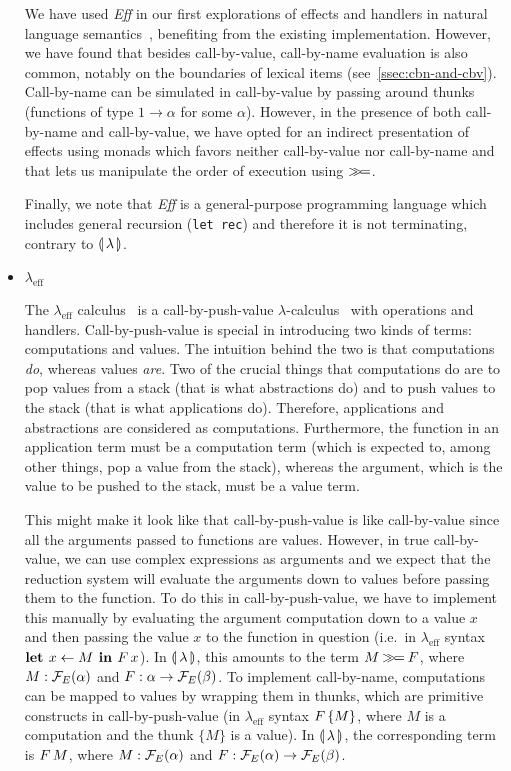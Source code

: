 \begin{itemize}
  We have used \emph{Eff} in our first explorations of effects and handlers
  in natural language semantics~\cite{marsik2014algebraic}, benefiting from
  the existing implementation. However, we have found that besides
  call-by-value, call-by-name evaluation is also common, notably on the
  boundaries of lexical items (see~\ref{ssec:cbn-and-cbv}). Call-by-name
  can be simulated in call-by-value by passing around thunks (functions of
  type $1 \to \alpha$ for some $\alpha$). However, in the presence of both
  call-by-name and call-by-value, we have opted for an indirect
  presentation of effects using monads which favors neither call-by-value
  nor call-by-name and that lets us manipulate the order of execution using
  $\mathbin{\gg\!=}$.

  Finally, we note that \emph{Eff} is a general-purpose programming
  language which includes general recursion (\texttt{let rec}) and
  therefore it is not terminating, contrary to ${\llparenthesis \, \lambda \, \rrparenthesis}$.
  
\item $\lambda_{\mathrm{eff}}$

  The $\lambda_{\mathrm{eff}}$ calculus~\cite{kammar2013handlers} is a
  call-by-push-value $\lambda$-calculus~\cite{levy1999call} with operations
  and handlers. Call-by-push-value is special in introducing two kinds of
  terms: computations and values. The intuition behind the two is that
  computations \emph{do}, whereas values \emph{are}. Two of the crucial
  things that computations do are to pop values from a stack (that is what
  abstractions do) and to push values to the stack (that is what
  applications do). Therefore, applications and abstractions are considered
  as computations. Furthermore, the function in an application term must be
  a computation term (which is expected to, among other things, pop a value
  from the stack), whereas the argument, which is the value to be pushed to
  the stack, must be a value term.

  This might make it look like that call-by-push-value is like
  call-by-value since all the arguments passed to functions are
  values. However, in true call-by-value, we can use complex expressions as
  arguments and we expect that the reduction system will evaluate the
  arguments down to values before passing them to the function. To do this
  in call-by-push-value, we have to implement this manually by evaluating
  the argument computation down to a value $x$ and then passing the value
  $x$ to the function in question (i.e.\ in $\lambda_{\mathrm{eff}}$ syntax
  $\textbf{let } x \leftarrow M \textbf{ in } F\,x$). In ${\llparenthesis \, \lambda \, \rrparenthesis}$, this
  amounts to the term $M \mathbin{\gg\!=} F$, where $M : \mathcal{F}_E(\alpha)$ and
  $F : \alpha \to \mathcal{F}_E(\beta)$. To implement call-by-name, computations
  can be mapped to values by wrapping them in thunks, which are primitive
  constructs in call-by-push-value (in $\lambda_{\mathrm{eff}}$ syntax
  $F\,\{M\}$, where $M$ is a computation and the thunk $\{M\}$ is a
  value). In ${\llparenthesis \, \lambda \, \rrparenthesis}$, the corresponding term is $F\,M$, where
  $M : \mathcal{F}_E(\alpha)$ and $F : \mathcal{F}_E(\alpha) \to \mathcal{F}_E(\beta)$.


\end{itemize}
